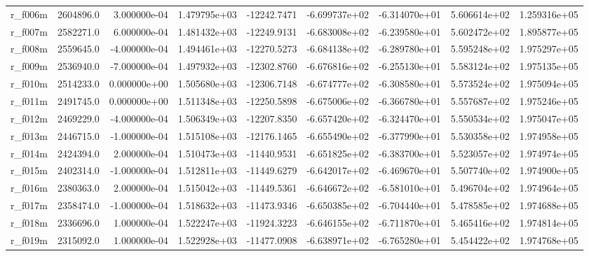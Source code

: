 \documentclass[10pt]{article}
\begin{document}
\begin{landscape}
\begin{longtable}{|l|r|r|r|r|r|r|r|r|}
r\_f006m                 &  2604896.0 &  3.000000e-04 &  1.479795e+03 & -12242.7471 & -6.699737e+02 & -6.314070e+01 &  5.606614e+02 &  1.259316e+05 \\
r\_f007m                 &  2582271.0 &  6.000000e-04 &  1.481432e+03 & -12249.9131 & -6.683008e+02 & -6.239580e+01 &  5.602472e+02 &  1.895877e+05 \\
r\_f008m                 &  2559645.0 & -4.000000e-04 &  1.494461e+03 & -12270.5273 & -6.684138e+02 & -6.289780e+01 &  5.595248e+02 &  1.975297e+05 \\
r\_f009m                 &  2536940.0 & -7.000000e-04 &  1.497932e+03 & -12302.8760 & -6.676816e+02 & -6.255130e+01 &  5.583124e+02 &  1.975135e+05 \\
r\_f010m                 &  2514233.0 &  0.000000e+00 &  1.505680e+03 & -12306.7148 & -6.674777e+02 & -6.308580e+01 &  5.573524e+02 &  1.975094e+05 \\
r\_f011m                 &  2491745.0 &  0.000000e+00 &  1.511348e+03 & -12250.5898 & -6.675006e+02 & -6.366780e+01 &  5.557687e+02 &  1.975246e+05 \\
r\_f012m                 &  2469229.0 & -4.000000e-04 &  1.506349e+03 & -12207.8350 & -6.657420e+02 & -6.324470e+01 &  5.550534e+02 &  1.975047e+05 \\
r\_f013m                 &  2446715.0 & -1.000000e-04 &  1.515108e+03 & -12176.1465 & -6.655490e+02 & -6.377990e+01 &  5.530358e+02 &  1.974958e+05 \\
r\_f014m                 &  2424394.0 &  2.000000e-04 &  1.510473e+03 & -11440.9531 & -6.651825e+02 & -6.383700e+01 &  5.523057e+02 &  1.974974e+05 \\
r\_f015m                 &  2402314.0 & -1.000000e-04 &  1.512811e+03 & -11449.6279 & -6.642017e+02 & -6.469670e+01 &  5.507740e+02 &  1.974900e+05 \\
r\_f016m                 &  2380363.0 &  2.000000e-04 &  1.515042e+03 & -11449.5361 & -6.646672e+02 & -6.581010e+01 &  5.496704e+02 &  1.974964e+05 \\
r\_f017m                 &  2358474.0 & -1.000000e-04 &  1.518632e+03 & -11473.9346 & -6.650385e+02 & -6.704440e+01 &  5.478585e+02 &  1.974688e+05 \\
r\_f018m                 &  2336696.0 &  1.000000e-04 &  1.522247e+03 & -11924.3223 & -6.646155e+02 & -6.711870e+01 &  5.465416e+02 &  1.974814e+05 \\
r\_f019m                 &  2315092.0 &  1.000000e-04 &  1.522928e+03 & -11477.0908 & -6.638971e+02 & -6.765280e+01 &  5.454422e+02 &  1.974768e+05 \\

\end{longtable}
\end{landscape}
\end{document}
